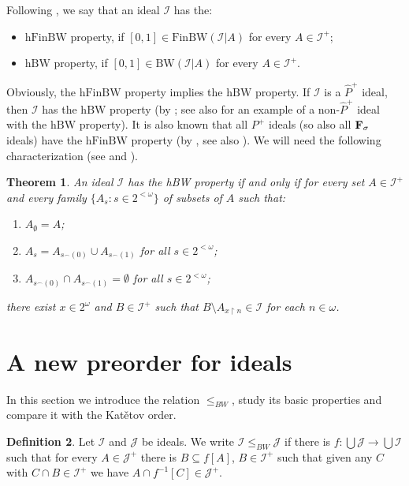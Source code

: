 \documentclass{amsart}
\theoremstyle{plain}
\newtheorem{theorem}{Theorem}[section]
\theoremstyle{definition}
\newtheorem{definition}[theorem]{Definition}
\theoremstyle{remark}
\newcommand{\cI}{\mathcal{I}}
\newcommand{\I}{\cI}
\newcommand{\cJ}{\mathcal{J}}
\newcommand{\J}{\cJ}
\newcommand{\BW}{\mathrm{BW}}
\newcommand{\FinBW}{\mathrm{FinBW}}
\newcommand{\hFinBW}{\mathrm{hFinBW}}
\newcommand{\hBW}{\mathrm{hBW}}
\begin{document}
Following \cite{MR2320288}, we say that an ideal $\I$ has the:
\begin{itemize}
    \item $\hFinBW$ property, if $[0,1]\in\FinBW(\I|A)$ for every $A\in\I^+$;
    \item $\hBW$ property, if $[0,1]\in\BW(\I|A)$ for every $A\in\I^+$.
\end{itemize}
Obviously, the $\hFinBW$ property implies the $\hBW$ property. If $\I$ is a $\widehat{P}^+$ ideal, then $\I$ has the $\hBW$ property (by \cite[Proposition 3.5]{MR2320288}; see also \cite[Proposition 2.13]{Ultrafilters} for an example of a non-$\widehat{P}^+$ ideal with the $\hBW$ property). It is also known that all $P^+$ ideals (so also all $\bf{F_\sigma}$ ideals) have the $\hFinBW$ property (by \cite[Proposition 2.8]{zbMATH06010584}, see also \cite[Proposition 3.4]{MR2320288}). We will need the following characterization (see \cite[Proposition 3.3]{MR2320288} and \cite[Proposition 2.9]{zbMATH06010584}).

\begin{theorem}\label{thm: hbw charakteryzacja}
An ideal $\I$ has the hBW property if and only if for every set $A\in \I^+$ and every family $\{A_s: s\in 2^{<\omega}\}$ of subsets of $A$ such that:
\begin{enumerate}
\item $A_{\emptyset}=A$;
\item $A_s=A_{s^{\frown} (0)} \cup A_{s^{\frown} (1)}$ for all $s\in 2^{<\omega}$;
\item $A_{s^{\frown}  (0)} \cap A_{s^{\frown} (1)}=\emptyset$ for all $s\in 2^{<\omega}$;
\end{enumerate}
there exist $x\in 2^{\omega}$ and $B\in \I^+$ such that $B\setminus A_{x\restriction n}\in \cI$ for each $n\in \omega$. 
\end{theorem}






\section{A new preorder for ideals}
\label{sec:basic}

In this section we introduce the relation $\leq_{BW}$, study its basic properties and compare it with the Kat\v{e}tov order.

\begin{definition}
Let $\I$ and $\J$ be ideals. We write $\I\leq_{BW}\J$ if there is $f:\bigcup\J\to\bigcup\I$ such that for every $A\in\J^+$ there is $B\subseteq f[A]$, $B\in\I^+$ such that given any $C$ with $C\cap B\in\I^+$ we have $A\cap f^{-1}[C]\in\J^+$.
\end{definition}
\end{document}
